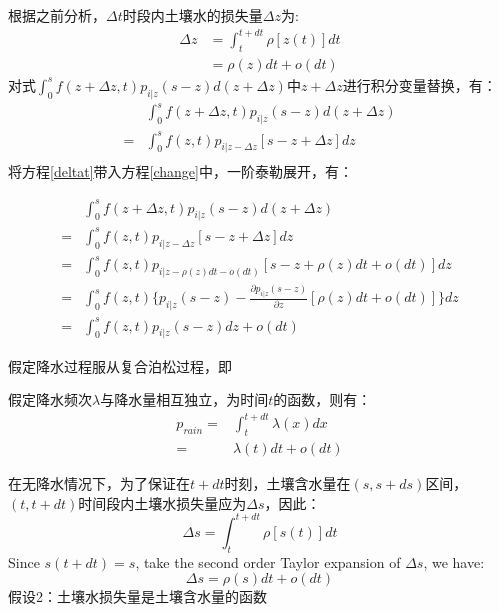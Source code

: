 根据之前分析，$\Delta t$时段内土壤水的损失量$\Delta z$为:
\begin{equation}
\label{deltat}
\begin{split}
\Delta z&=\int_t^{t+dt} \rho[z(t)]dt\\&=\rho(z)dt+o(dt)
\end{split}
\end{equation} 
对式$\int_{0}^{s} f(z+\Delta z,t)p_{i|z}(s-z)d(z+\Delta z)$中$z+\Delta z$进行积分变量替换，有：
\begin{equation}
\label{change}
\begin{split}
 &\int_{0}^{s} f(z+\Delta z,t)p_{i|z}(s-z)d(z+\Delta z)\\
 =&\int_{0}^{s} f(z,t)p_{i|z-\Delta z}[s-z+\Delta z]dz\\
 \end{split}
\end{equation}
将方程\ref{deltat}带入方程\ref{change}中，一阶泰勒展开，有：

\begin{equation}
\label{change2}
\begin{split}
&\int_{0}^{s} f(z+\Delta z,t)p_{i|z}(s-z)d(z+\Delta z)\\
=&\int_{0}^{s} f(z,t)p_{i|z-\Delta z}[s-z+\Delta z]dz\\
=&\int_{0}^{s} f(z,t)p_{i|z-\rho(z)dt-o(dt)}[s-z+\rho(z)dt+o(dt)]dz\\
 =&\int_{0}^{s} f(z,t)\lbrace p_{i|z}(s-z)-\frac{\partial p_{i|z}(s-z)}{\partial z}[\rho(z)dt+o(dt)]\rbrace dz\\
 =&\int_{0}^{s} f(z,t)p_{i|z}(s-z)dz+o(dt)
 \end{split}
\end{equation}





\iffalse
假定降水过程服从复合泊松过程，即







假定降水频次$\lambda$与降水量相互独立，为时间$t$的函数，则有：
\begin{equation}
\label{rainchance}
\begin{split}
p_{rain}=&\int_t^{t+dt} \lambda(x)dx\\=&\lambda(t)dt+o(dt)
\end{split}
\end{equation}




在无降水情况下，为了保证在$t+dt$时刻，土壤含水量在$(s,s+ds)$区间，$(t,t+dt)$时间段内土壤水损失量应为$\Delta s$，因此：
\begin{equation}
\Delta s=\int_t^{t+dt} \rho[s(t)]dt
\end{equation}
Since $s(t+dt)= s$, take the second order Taylor expansion of $\Delta s$, we have:
\begin{equation}
\label{loss}
\Delta s=\rho(s)dt+o(dt)
\end{equation}
假设2：土壤水损失量是土壤含水量的函数

